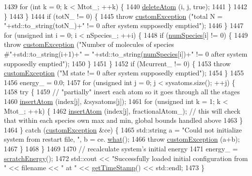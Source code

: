 \begin{DoxyCode}
1439             \textcolor{keywordflow}{for} (\textcolor{keywordtype}{int} k = 0; k < Mtot\_; ++k) \{
1440                 \hyperlink{classsim_system_acabf4fc5b5b90bba62e1449ddb3646c6}{deleteAtom} (i, j, \textcolor{keyword}{true});
1441             \}
1442         \}
1443     \}
1444     \textcolor{keywordflow}{if} (totN\_ != 0) \{
1445         \textcolor{keywordflow}{throw} \hyperlink{classcustom_exception}{customException} (\textcolor{stringliteral}{"total N = "}+std::to\_string(totN\_)+\textcolor{stringliteral}{" != 0 after system
       supposedly emptied"});
1446     \}
1447     \textcolor{keywordflow}{for} (\textcolor{keywordtype}{unsigned} \textcolor{keywordtype}{int} i = 0; i < nSpecies\_; ++i) \{
1448         \textcolor{keywordflow}{if} (\hyperlink{classsim_system_a9eea865e6dc1cff377b1e79c4d9c23f0}{numSpecies}[i] != 0) \{
1449             \textcolor{keywordflow}{throw} \hyperlink{classcustom_exception}{customException} (\textcolor{stringliteral}{"Number of molecules of species #"}+std::to\_string(i+1)+\textcolor{stringliteral}{"
       = "}+std::to\_string(\hyperlink{classsim_system_a9eea865e6dc1cff377b1e79c4d9c23f0}{numSpecies}[i])+\textcolor{stringliteral}{" != 0 after system supposedly emptied"});
1450         \}
1451     \}
1452     \textcolor{keywordflow}{if} (Mcurrent\_ != 0) \{
1453         \textcolor{keywordflow}{throw} \hyperlink{classcustom_exception}{customException} (\textcolor{stringliteral}{"M state != 0 after system supposedly emptied"});
1454     \}
1455 
1456     energy\_ = 0.0;
1457     \textcolor{keywordflow}{for} (\textcolor{keywordtype}{unsigned} \textcolor{keywordtype}{int} j = 0; j < sysatoms.size(); ++j) \{
1458         \textcolor{keywordflow}{try} \{
1459             \textcolor{comment}{// "partially" insert each atom so it goes through all the stages}
1460             \hyperlink{classsim_system_a0404e9435cc046d19b6bb990678ee069}{insertAtom} (index[j], &sysatoms[j]);
1461             \textcolor{keywordflow}{for} (\textcolor{keywordtype}{unsigned} \textcolor{keywordtype}{int} k = 1; k < Mtot\_; ++k) \{
1462                 \hyperlink{classsim_system_a0404e9435cc046d19b6bb990678ee069}{insertAtom} (index[j], fractionalAtom\_); \textcolor{comment}{// this will check that within each
       species own max and min, global bounds handled above}
1463             \}
1464         \} \textcolor{keywordflow}{catch} (\hyperlink{classcustom_exception}{customException} &ce) \{
1465             std::string a = \textcolor{stringliteral}{"Could not initialize system from restart file, "}, b = ce.
      \hyperlink{classcustom_exception_aeb6ab5848b038adfc68fde86a512f691}{what}();
1466             \textcolor{keywordflow}{throw} \hyperlink{classcustom_exception}{customException} (a+b);
1467         \}
1468     \}
1469 
1470     \textcolor{comment}{// recalculate system's initial energy}
1471     energy\_ = \hyperlink{classsim_system_a51539ed4c3bb4905b32ce428c1c537fe}{scratchEnergy}();
1472     std::cout << \textcolor{stringliteral}{"Successfully loaded initial configuration from "} << filename << \textcolor{stringliteral}{" at "} << 
      \hyperlink{utilities_8cpp_aa6d910bf51f18a75deb20c6f0fbba285}{getTimeStamp}() << std::endl;
1473 \}
\end{DoxyCode}
